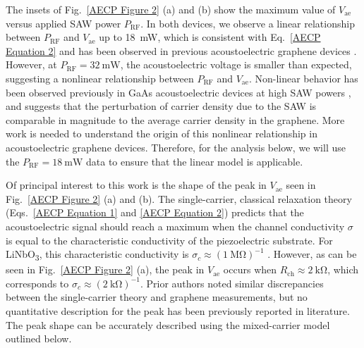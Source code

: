 \documentclass{beavtex_dub_edit}
\begin{document}
The insets of Fig.\ \ref{AECP Figure 2} (a) and (b) show the maximum value of $V_{\mathrm{ae}}$ versus applied SAW power $P_{\mathrm{RF}}$. In both devices, we observe a linear relationship between $P_{\mathrm{RF}}$ and $V_{\mathrm{ae}}$ up to \SI{18}{\milli\watt}, which is consistent with Eq.\ \ref{AECP Equation 2} and has been observed in previous acoustoelectric graphene devices \cite{bandhu_macroscopic_2013}. However, at $P_{\mathrm{RF}}=\SI{32}{\milli\watt}$, the acoustoelectric voltage is smaller than expected, suggesting a nonlinear relationship between $P_{\mathrm{RF}}$ and $V_{\mathrm{ae}}$. Non-linear behavior has been observed previously in GaAs acoustoelectric devices at high SAW powers \cite{rotter_nonlinear_1999}, and suggests that the perturbation of carrier density due to the SAW is comparable in magnitude to the average carrier density in the graphene. More work is needed to understand the origin of this nonlinear relationship in acoustoelectric graphene devices. Therefore, for the analysis below, we will use the $P_{\mathrm{RF}} = \SI{18}{\milli\watt}$ data to ensure that the linear model is applicable. 

Of principal interest to this work is the shape of the peak in $V_{\mathrm{ae}}$ seen in Fig.\ \ref{AECP Figure 2} (a) and (b). The single-carrier, classical relaxation theory (Eqs.\ \ref{AECP Equation 1} and \ref{AECP Equation 2}) predicts that the acoustoelectric signal should reach a maximum when the channel conductivity $\sigma$ is equal to the characteristic conductivity of the piezoelectric substrate. For LiNbO\textsubscript{3}, this characteristic conductivity is $\sigma_c \approx (\SI{1}{\mega\ohm})^{-1}$ \cite{wixforth_surface_1989,rotter_giant_1998}. However, as can be seen in Fig.\ \ref{AECP Figure 2} (a), the peak in $V_{\mathrm{ae}}$ occurs when $R_{\mathrm{ch}} \approx \SI{2}{\kilo\ohm}$, which corresponds to $\sigma_c \approx (\SI{2}{\kilo\ohm})^{-1}$. Prior authors noted similar discrepancies between the single-carrier theory and graphene measurements, but no quantitative description for the peak has been previously reported in literature. The peak shape can be accurately described using the mixed-carrier model outlined below.
\end{document}
